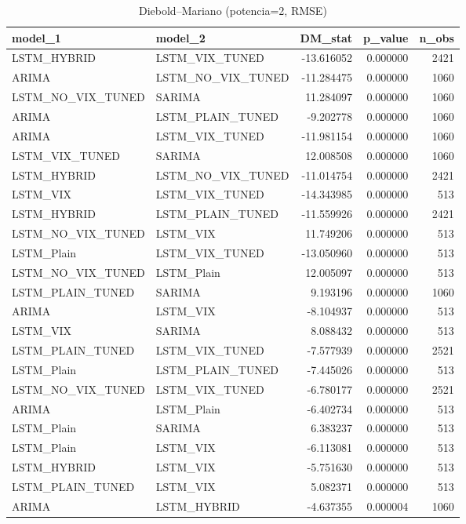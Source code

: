 \begin{table}
\caption{Diebold–Mariano (potencia=2, RMSE)}
\label{dm_rmse}
\begin{tabular}{llrrr}
\toprule
model_1 & model_2 & DM_stat & p_value & n_obs \\
\midrule
LSTM_HYBRID & LSTM_VIX_TUNED & -13.616052 & 0.000000 & 2421 \\
ARIMA & LSTM_NO_VIX_TUNED & -11.284475 & 0.000000 & 1060 \\
LSTM_NO_VIX_TUNED & SARIMA & 11.284097 & 0.000000 & 1060 \\
ARIMA & LSTM_PLAIN_TUNED & -9.202778 & 0.000000 & 1060 \\
ARIMA & LSTM_VIX_TUNED & -11.981154 & 0.000000 & 1060 \\
LSTM_VIX_TUNED & SARIMA & 12.008508 & 0.000000 & 1060 \\
LSTM_HYBRID & LSTM_NO_VIX_TUNED & -11.014754 & 0.000000 & 2421 \\
LSTM_VIX & LSTM_VIX_TUNED & -14.343985 & 0.000000 & 513 \\
LSTM_HYBRID & LSTM_PLAIN_TUNED & -11.559926 & 0.000000 & 2421 \\
LSTM_NO_VIX_TUNED & LSTM_VIX & 11.749206 & 0.000000 & 513 \\
LSTM_Plain & LSTM_VIX_TUNED & -13.050960 & 0.000000 & 513 \\
LSTM_NO_VIX_TUNED & LSTM_Plain & 12.005097 & 0.000000 & 513 \\
LSTM_PLAIN_TUNED & SARIMA & 9.193196 & 0.000000 & 1060 \\
ARIMA & LSTM_VIX & -8.104937 & 0.000000 & 513 \\
LSTM_VIX & SARIMA & 8.088432 & 0.000000 & 513 \\
LSTM_PLAIN_TUNED & LSTM_VIX_TUNED & -7.577939 & 0.000000 & 2521 \\
LSTM_Plain & LSTM_PLAIN_TUNED & -7.445026 & 0.000000 & 513 \\
LSTM_NO_VIX_TUNED & LSTM_VIX_TUNED & -6.780177 & 0.000000 & 2521 \\
ARIMA & LSTM_Plain & -6.402734 & 0.000000 & 513 \\
LSTM_Plain & SARIMA & 6.383237 & 0.000000 & 513 \\
LSTM_Plain & LSTM_VIX & -6.113081 & 0.000000 & 513 \\
LSTM_HYBRID & LSTM_VIX & -5.751630 & 0.000000 & 513 \\
LSTM_PLAIN_TUNED & LSTM_VIX & 5.082371 & 0.000000 & 513 \\
ARIMA & LSTM_HYBRID & -4.637355 & 0.000004 & 1060 \\

\end{tabular}
\end{table}
